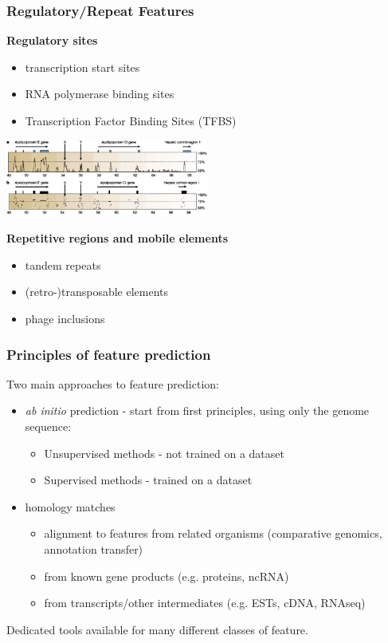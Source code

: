 \begin{frame}
  \frametitle{Regulatory/Repeat Features}
  \textbf{Regulatory sites}
  \begin{itemize}
    \item transcription start sites
    \item RNA polymerase binding sites
    \item Transcription Factor Binding Sites (TFBS)
  \end{itemize}
  \begin{center}
    \includegraphics[width=0.5\textwidth]{images/regulatory_sites}
  \end{center}
  \textbf{Repetitive regions and mobile elements}
  \begin{itemize}
    \item tandem repeats
    \item (retro-)transposable elements
    \item phage inclusions
  \end{itemize}  
\end{frame}

\begin{frame}
  \frametitle{Principles of feature prediction}
  Two main approaches to feature prediction:
  \begin{itemize}
    \item \textit{ab initio} prediction - start from first principles, using only the genome sequence: 
    \begin{itemize}
      \item Unsupervised methods - not trained on a dataset
      \item Supervised methods - trained on a dataset
    \end{itemize}
    \item homology matches
    \begin{itemize}
      \item alignment to features from related organisms (comparative genomics, annotation transfer)
      \item from known gene products (e.g. proteins, ncRNA)
      \item from transcripts/other intermediates (e.g. ESTs, cDNA, RNAseq)
    \end{itemize}
  \end{itemize}
  Dedicated tools available for many different classes of feature.
\end{frame}